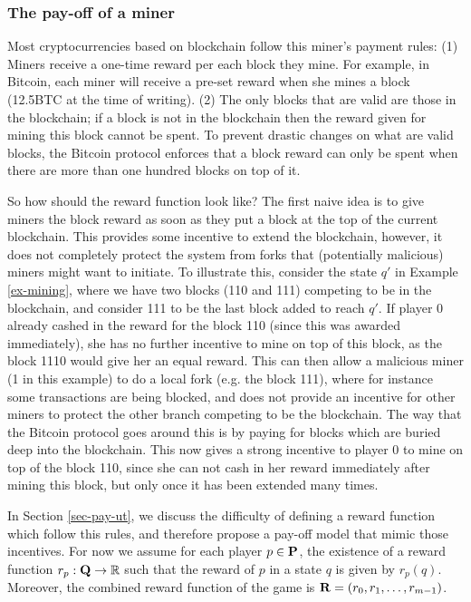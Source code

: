 \subsubsection{The pay-off of a miner}
Most cryptocurrencies based on blockchain follow this miner's payment rules:
%
(1) Miners receive a one-time reward per each block they mine. For example, in Bitcoin, each miner will receive a pre-set reward when she mines a block (12.5BTC at the time of writing).
%
(2) The only blocks that are valid are those in the blockchain; if a block is not in the blockchain then the reward given for mining this block cannot be spent. To prevent drastic changes on what are valid blocks, the Bitcoin protocol enforces that a block reward can only be spent when there are more than one hundred blocks on top of it. 

So how should the reward function look like? The first naive idea is to give miners the block reward as soon as they put a block at the top of the current blockchain. This provides some incentive to extend the blockchain, however, it does not completely protect the system from forks that (potentially malicious) miners might want to initiate. To illustrate this, consider the state $q'$ in Example \ref{ex-mining}, where we have two blocks (110 and 111) competing to be in the blockchain, and consider 111 to be the last block added to reach $q'$. If player 0 already cashed in the reward for the block 110 (since this was awarded immediately), she has no further incentive to mine on top of this block, as the block 1110 would give her an equal reward. This can then allow a malicious miner (1 in this example) to do a local fork (e.g. the block 111), where for instance some transactions are being blocked, and does not provide an incentive for other miners to protect the other branch competing to be the blockchain. The way that the Bitcoin protocol goes around this is by paying for blocks which are buried deep into the blockchain.
This now gives a strong incentive to player 0 to mine on top of the block 110, since she can not cash in her reward immediately after mining this block, but only once it has been extended many times.

In Section \ref{sec-pay-ut}, we discuss the difficulty of defining a reward function which follow this rules, and therefore propose a pay-off model that mimic those incentives. For now we assume for each player $p \in \mathbf{P}$,  the existence of a reward function $r_p : \mathbf{Q} \to \mathbb{R}$ such that the reward of $p$ in a state $q$ is given by $r_p(q)$. Moreover, the combined reward function of the game is $\mathbf{R} = (r_0, r_1, \ldots, r_{m-1})$. 

